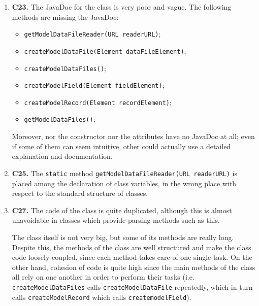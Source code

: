 \begin{enumerate}
\item \textbf{C23.} The JavaDoc for the class is very poor and vague. The following methods are missing the JavaDoc:
	\begin{itemize}
	\item \texttt{getModelDataFileReader(URL readerURL)};
	\item \texttt{createModelDataFile(Element dataFileElement)};
	\item \texttt{createModelDataFiles()};
	\item \texttt{createModelField(Element fieldElement)};
	\item \texttt{createModelRecord(Element recordElement)};
	\item \texttt{getModelDataFiles()};
	\end{itemize}
Moreover, nor the constructor nor the attributes have no JavaDoc at all; even if some of them can seem intuitive, other could actually use a detailed explanation and documentation.
\item \textbf{C25.} The \texttt{static} method \texttt{getModelDataFileReader(URL readerURL)} is placed among the declaration of class variables, in the wrong place with respect to the standard structure of classes.
\item \textbf{C27.} The code of the class is quite duplicated, although this is almost unavoidable in classes which provide parsing methods such as this.

The class itself is not very big, but some of its methods are really long. Despite this, the methods of the class are well structured and make the class code loosely coupled, since each method takes care of one single task. On the other hand, cohesion of code is quite high since the main methods of the class all rely on one another in order to perform their tasks (i.e. \texttt{createModelDataFiles} calls \texttt{createModelDataFile} repeatedly, which in turn calls \texttt{createModelRecord} which calls \texttt{createmodelField}).


\end{enumerate}
